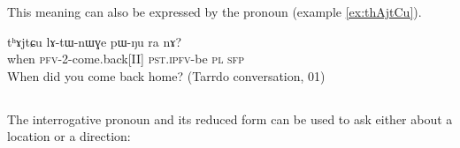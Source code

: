 This meaning can also be expressed by the pronoun   (example \ref{ex:thAjtCu}).

\begin{exe}
\ex \label{ex:thAjtCu}
\gll  tʰɤjtɕu 	lɤ-tɯ-nɯɣe 	pɯ-ŋu 	ra 	nɤ?    \\
 when \textsc{pfv}-2-come.back[II] \textsc{pst.ipfv}-be \textsc{pl} \textsc{sfp} \\
\glt  When did you come back home? (Tarrdo conversation, 01)
\end{exe} 

\subsection{}

The interrogative pronoun  and its reduced form  can be used to ask either about a location or a direction:
%
% 
%
% 
% 
% 
%
%
%
%
%

